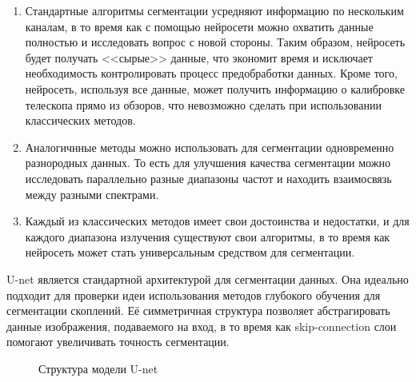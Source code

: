 \begin{enumerate}
    \item Стандартные алгоритмы сегментации усредняют информацию по нескольким каналам,
        в то время как с помощью нейросети можно охватить данные полностью и исследовать вопрос с 
        новой стороны. Таким образом, нейросеть будет получать <<сырые>> данные, что экономит время 
        и исключает необходимость контролировать процесс предобработки данных. 
        Кроме того, нейросеть, используя все данные, может получить информацию о 
        калибровке телескопа прямо из обзоров, что невозможно сделать при использовании классических 
        методов.
    \item Аналогичнные методы можно использовать для сегментации одновременно разнородных данных. 
        То есть для улучшения качества сегментации можно исследовать параллельно разные диапазоны 
        частот и находить взаимосвязь между разными спектрами.
    \item Каждый из классических методов имеет свои достоинства и недостатки, и для каждого 
        диапазона излучения существуют свои алгоритмы, в то время как 
        нейросеть может стать универсальным средством для сегментации.
\end{enumerate}

U-net \cite{Unet} является стандартной архитектурой для сегментации данных. Она идеально подходит 
для проверки идеи использования методов глубокого обучения для сегментации скоплений.
Её симметричная структура позволяет абстрагировать данные изображения, подаваемого на 
вход, в то время как skip-connection слои помогают увеличивать точность сегментации.

\begin{figure}[h]
    \caption{Структура модели U-net \cite{Unet}}
\end{figure}


